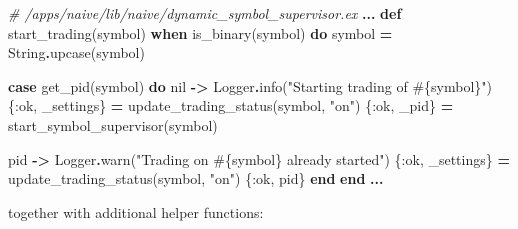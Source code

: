 \documentclass[
  oneside]{book}
\newenvironment{Shaded}{\begin{snugshade}}{\end{snugshade}}
\newcommand{\CommentTok}[1]{\textcolor[rgb]{0.56,0.35,0.01}{\textit{#1}}}
\newcommand{\ConstantTok}[1]{\textcolor[rgb]{0.00,0.00,0.00}{#1}}
\newcommand{\KeywordTok}[1]{\textcolor[rgb]{0.13,0.29,0.53}{\textbf{#1}}}
\newcommand{\NormalTok}[1]{#1}
\newcommand{\OperatorTok}[1]{\textcolor[rgb]{0.81,0.36,0.00}{\textbf{#1}}}
\newcommand{\OtherTok}[1]{\textcolor[rgb]{0.56,0.35,0.01}{#1}}
\newcommand{\StringTok}[1]{\textcolor[rgb]{0.31,0.60,0.02}{#1}}
\newcommand{\VariableTok}[1]{\textcolor[rgb]{0.00,0.00,0.00}{#1}}
\begin{document}
\begin{Shaded}
\begin{Highlighting}[]
\CommentTok{\# /apps/naive/lib/naive/dynamic\_symbol\_supervisor.ex}
  \OperatorTok{...}
  \KeywordTok{def}\NormalTok{ start\_trading(symbol) }\KeywordTok{when}\NormalTok{ is\_binary(symbol) }\KeywordTok{do}
\NormalTok{    symbol }\OperatorTok{=} \ConstantTok{String}\OperatorTok{.}\NormalTok{upcase(symbol)}
    
    \KeywordTok{case}\NormalTok{ get\_pid(symbol) }\KeywordTok{do}
      \ConstantTok{nil} \OperatorTok{{-}\textgreater{}}
        \ConstantTok{Logger}\OperatorTok{.}\NormalTok{info(}\StringTok{"Starting trading of }\OtherTok{\#\{}\NormalTok{symbol}\OtherTok{\}}\StringTok{"}\NormalTok{)}
\NormalTok{        \{}\VariableTok{:ok}\NormalTok{, \_settings\} }\OperatorTok{=}\NormalTok{ update\_trading\_status(symbol, }\StringTok{"on"}\NormalTok{)}
\NormalTok{        \{}\VariableTok{:ok}\NormalTok{, \_pid\} }\OperatorTok{=}\NormalTok{ start\_symbol\_supervisor(symbol)}

\NormalTok{      pid }\OperatorTok{{-}\textgreater{}}
        \ConstantTok{Logger}\OperatorTok{.}\NormalTok{warn(}\StringTok{"Trading on }\OtherTok{\#\{}\NormalTok{symbol}\OtherTok{\}}\StringTok{ already started"}\NormalTok{)}
\NormalTok{        \{}\VariableTok{:ok}\NormalTok{, \_settings\} }\OperatorTok{=}\NormalTok{ update\_trading\_status(symbol, }\StringTok{"on"}\NormalTok{)}
\NormalTok{        \{}\VariableTok{:ok}\NormalTok{, pid\}}
    \KeywordTok{end}
  \KeywordTok{end}
  \OperatorTok{...}
\end{Highlighting}
\end{Shaded}

together with additional helper functions:
\end{document}
